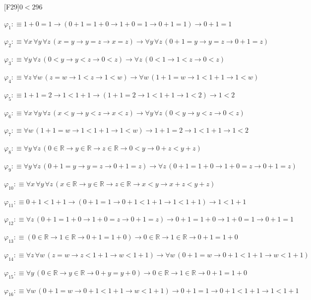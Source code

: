 \begin{fullproof}{[F29]}{$0 < 2$}{96}
\begin{abbrevlist}
\item $\varphi_{1} :\equiv 1 + 0 = 1 \to (0 + 1 = 1 + 0 \to 1 + 0 = 1 \to 0 + 1 = 1) \to 0 + 1 = 1$
\item $\varphi_{2} :\equiv \forall x\,\forall y\,\forall z\,(x = y \to y = z \to x = z) \to \forall y\,\forall z\,(0 + 1 = y \to y = z \to 0 + 1 = z)$
\item $\varphi_{3} :\equiv \forall y\,\forall z\,(0 < y \to y < z \to 0 < z) \to \forall z\,(0 < 1 \to 1 < z \to 0 < z)$
\item $\varphi_{4} :\equiv \forall z\,\forall w\,(z = w \to 1 < z \to 1 < w) \to \forall w\,(1 + 1 = w \to 1 < 1 + 1 \to 1 < w)$
\item $\varphi_{5} :\equiv 1 + 1 = 2 \to 1 < 1 + 1 \to (1 + 1 = 2 \to 1 < 1 + 1 \to 1 < 2) \to 1 < 2$
\item $\varphi_{6} :\equiv \forall x\,\forall y\,\forall z\,(x < y \to y < z \to x < z) \to \forall y\,\forall z\,(0 < y \to y < z \to 0 < z)$
\item $\varphi_{7} :\equiv \forall w\,(1 + 1 = w \to 1 < 1 + 1 \to 1 < w) \to 1 + 1 = 2 \to 1 < 1 + 1 \to 1 < 2$
\item $\varphi_{8} :\equiv \forall y\,\forall z\,(0 \in \mathbb{R} \to y \in \mathbb{R} \to z \in \mathbb{R} \to 0 < y \to 0 + z < y + z)$
\item $\varphi_{9} :\equiv \forall y\,\forall z\,(0 + 1 = y \to y = z \to 0 + 1 = z) \to \forall z\,(0 + 1 = 1 + 0 \to 1 + 0 = z \to 0 + 1 = z)$
\item $\varphi_{10} :\equiv \forall x\,\forall y\,\forall z\,(x \in \mathbb{R} \to y \in \mathbb{R} \to z \in \mathbb{R} \to x < y \to x + z < y + z)$
\item $\varphi_{11} :\equiv 0 + 1 < 1 + 1 \to (0 + 1 = 1 \to 0 + 1 < 1 + 1 \to 1 < 1 + 1) \to 1 < 1 + 1$
\item $\varphi_{12} :\equiv \forall z\,(0 + 1 = 1 + 0 \to 1 + 0 = z \to 0 + 1 = z) \to 0 + 1 = 1 + 0 \to 1 + 0 = 1 \to 0 + 1 = 1$
\item $\varphi_{13} :\equiv (0 \in \mathbb{R} \to 1 \in \mathbb{R} \to 0 + 1 = 1 + 0) \to 0 \in \mathbb{R} \to 1 \in \mathbb{R} \to 0 + 1 = 1 + 0$
\item $\varphi_{14} :\equiv \forall z\,\forall w\,(z = w \to z < 1 + 1 \to w < 1 + 1) \to \forall w\,(0 + 1 = w \to 0 + 1 < 1 + 1 \to w < 1 + 1)$
\item $\varphi_{15} :\equiv \forall y\,(0 \in \mathbb{R} \to y \in \mathbb{R} \to 0 + y = y + 0) \to 0 \in \mathbb{R} \to 1 \in \mathbb{R} \to 0 + 1 = 1 + 0$
\item $\varphi_{16} :\equiv \forall w\,(0 + 1 = w \to 0 + 1 < 1 + 1 \to w < 1 + 1) \to 0 + 1 = 1 \to 0 + 1 < 1 + 1 \to 1 < 1 + 1$

\end{abbrevlist}
\end{fullproof}
